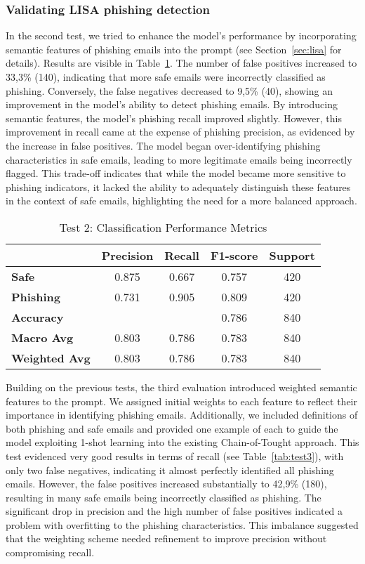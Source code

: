 \subsubsection{Validating LISA phishing detection}
\label{sec:vallisa}

In the second test, we tried to enhance the model’s performance by incorporating semantic features of phishing emails into the prompt (see Section~\ref{sec:lisa} for details).
Results are visible in Table~\ref{tab:test2}. The number of false positives increased to 33,3\% (140), indicating that more safe emails were incorrectly classified as phishing. Conversely, the false negatives decreased to 9,5\% (40), showing an improvement in the model's ability to detect phishing emails. By introducing semantic features, the model's phishing recall improved slightly. However, this improvement in recall came at the expense of phishing precision, as evidenced by the increase in false positives. The model began over-identifying phishing characteristics in safe emails, leading to more legitimate emails being incorrectly flagged. This trade-off indicates that while the model became more sensitive to phishing indicators, it lacked the ability to adequately distinguish these features in the context of safe emails, highlighting the need for a more balanced approach.

\begin{table}[ht]
\centering
\caption{Test 2: Classification Performance Metrics}
\label{tab:test2}
\begin{tabular}{lcccc}
\toprule
& \textbf{Precision} & \textbf{Recall} & \textbf{F1-score} & \textbf{Support} \\
\midrule
\textbf{Safe}       & 0.875 & 0.667 & 0.757 & 420 \\
\textbf{Phishing}   & 0.731 & 0.905 & 0.809 & 420 \\
\midrule
\textbf{Accuracy}   & & & 0.786 & 840 \\
\textbf{Macro Avg}  & 0.803 & 0.786 & 0.783 & 840 \\
\textbf{Weighted Avg} & 0.803 & 0.786 & 0.783 & 840 \\
\bottomrule
\end{tabular}
\end{table}

Building on the previous tests, the third evaluation introduced weighted semantic features to the prompt. We assigned initial weights to each feature to reflect their importance in identifying phishing emails. Additionally, we included definitions of both phishing and safe emails and provided one example of each to guide the model exploiting 1-shot learning into the existing Chain-of-Tought approach. 
This test evidenced very good results in terms of recall (see Table~\ref{tab:test3}), with only two false negatives, indicating it almost perfectly identified all phishing emails. However, the false positives increased substantially to 42,9\% (180), resulting in many safe emails being incorrectly classified as phishing. The significant drop in precision and the high number of false positives indicated a problem with overfitting to the phishing characteristics. This imbalance suggested that the weighting scheme needed refinement to improve precision without compromising recall. 

